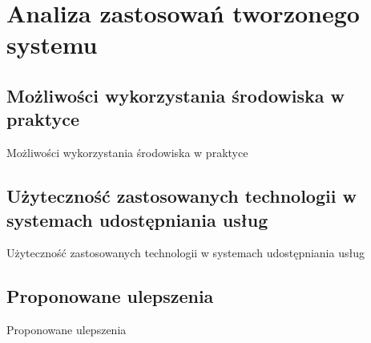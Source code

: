 \chapter{Analiza zastosowań tworzonego systemu}
\label{cha:zastosowania}


\section{Możliwości wykorzystania środowiska w praktyce}
\label{sec:wykorzystanieWPraktyce}

Możliwości wykorzystania środowiska w praktyce


\section{Użyteczność zastosowanych technologii w systemach udostępniania usług}
\label{sec:uzytecznosc}

Użyteczność zastosowanych technologii w systemach udostępniania usług


\section{Proponowane ulepszenia}
\label{sec:ulepszenia}

Proponowane ulepszenia

